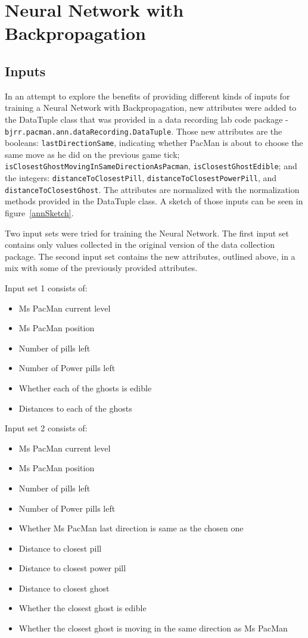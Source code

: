 \documentclass[conference]{IEEEtran}
\begin{document}
\section{Neural Network with Backpropagation}

\subsection{Inputs}

In an attempt to explore the benefits of providing different kinds of inputs for training a Neural Network with Backpropagation, new attributes were added to the DataTuple class that was provided in a data recording lab code package - \texttt{bjrr.pacman.ann.dataRecording.DataTuple}.  Those new attributes are the booleans: \texttt{lastDirectionSame}, indicating whether PacMan is about to choose the same move as he did on the previous game tick; \texttt{isClosestGhostMovingInSameDirectionAsPacman}, \texttt{isClosestGhostEdible}; and the integers:  \texttt{distanceToClosestPill}, \texttt{distanceToClosestPowerPill}, and \texttt{distanceToClosestGhost}.  The attributes are normalized with the normalization methods provided in the DataTuple class.  A sketch of those inputs can be seen in figure~\ref{annSketch}.

Two input sets were tried for training the Neural Network.  The first input set contains only values collected in the original version of the data collection package.  The second input set contains the new attributes, outlined above, in a mix with some of the previously provided attributes.

Input set 1 consists of:  
\begin{itemize}
	\item Ms PacMan current level
	\item Ms PacMan position
	\item Number of pills left
	\item Number of Power pills left
	\item Whether each of the ghosts is edible
	\item Distances to each of the ghosts
\end{itemize}

Input set 2 consists of:
\begin{itemize}
	\item Ms PacMan current level
	\item Ms PacMan position
	\item Number of pills left
	\item Number of Power pills left
	\item Whether Ms PacMan last direction is same as the chosen one
	\item Distance to closest pill
	\item Distance to closest power pill
	\item Distance to closest ghost
	\item Whether the closest ghost is edible
	\item Whether the closest ghost is moving in the same direction as Ms PacMan
\end{itemize}
\end{document}
